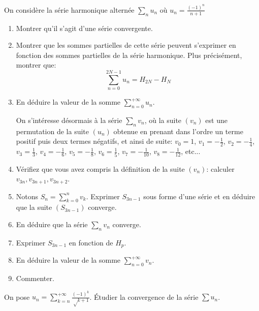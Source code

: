 \documentclass{yann}
\begin{document}
\Exercice

On considère la série harmonique alternée $∑_n u_n$ où $u_n = \frac{(-1)^n}{n+1}$
\begin{enumerate}
\item
Montrer qu'il s'agit d'une série convergente.
\item
Montrer que les sommes partielles de cette série peuvent s'exprimer
  en fonction des sommes partielles de la série harmonique.
  Plus précisément, montrer que:
  \[ ∑_{n = 0}^{2N-1} u_n = H_{2N} - H_N \]
\item
En déduire la valeur de la somme $∑_{n=0}^{+∞} u_n$.

  On s'intéresse désormais à la série $∑_n v_n$,
  où la suite $(v_n)$ est une permutation de la suite $(u_n)$
  obtenue en prenant dans l'ordre un terme positif puis deux termes négatifs, et ainsi de suite:
  $v_0 = 1$, $v_1 = - \frac12$, $v_2 = -\frac14$, $v_3 = \frac13$, $v_4 = -\frac16$, $v_5 = -\frac18$,
  $v_6 = \frac15$, $v_7 = -\frac{1}{10}$, $v_8 = -\frac{1}{12}$, etc...
\item
Vérifiez que vous avez compris la définition de la suite $(v_n)$: calculer $v_{3n}, v_{3n+1}, v_{3n+2}$.
\item
Notons $S_n =∑_{k=0}^n v_k$.
  Exprimer $S_{3n-1}$ sous forme d'une série et en déduire que la suite $(S_{3n-1})$ converge.
\item
En déduire que la série $∑_n v_n$ converge.
\item
Exprimer $S_{3n-1}$ en fonction de $H_p$.
\item
En déduire la valeur de la somme $∑_{n=0}^{+∞} v_n$.
\item
Commenter.
\end{enumerate}

\Exercice[dur]

On pose $u_n =∑_{k=n}^{+∞} \frac{(-1)^k}{√{k+1}}$.
Étudier la convergence de la série $∑ u_n$.

\end{document}
